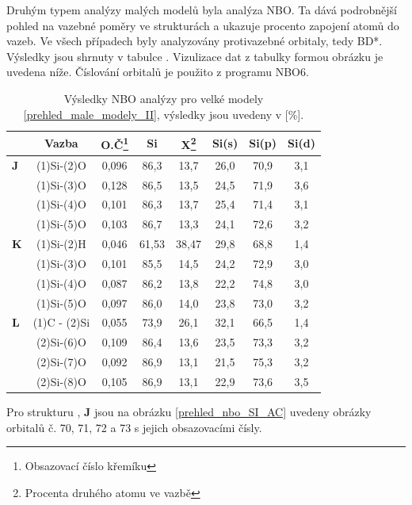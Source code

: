 \documentclass[
digital, %
table,   %
lof,     %
lot,     %
oneside,
]{fithesis3}
\begin{document}
Druhým typem analýzy malých modelů byla analýza NBO. Ta dává podrobnější pohled na vazebné poměry ve strukturách a ukazuje procento zapojení atomů do vazeb. Ve všech případech byly analyzovány protivazebné orbitaly, tedy BD*. Výsledky jsou shrnuty v tabulce . Vizulizace dat z tabulky formou obrázku je uvedena níže. Číslování orbitalů je použito z programu NBO6.
\begin{table}[htbp]
  \caption{Výsledky NBO analýzy pro velké modely \ref{prehled_male_modely_II}, výsledky jsou uvedeny v [\%].}
  \begin{minipage}{\textwidth}
\begin{center}
\begin{tabular}{|l|c|c|c|c|c|c|c|}

\hline\label{nbo_reaktanty_porovnani}&  Vazba & O.Č\footnote{Obsazovací číslo křemíku} & Si & X\footnote{Procenta druhého atomu ve  vazbě} & Si(s) & Si(p) &Si(d) \\ \hline
\textbf{J} & (1)Si-(2)O & 0,096 & 86,3  & 13,7  & 26,0  & 70,9  & 3,1  \\ \hline
 & (1)Si-(3)O & 0,128 & 86,5  & 13,5  & 24,5  & 71,9  & 3,6  \\ \hline
 & (1)Si-(4)O & 0,101 & 86,3  & 13,7  & 25,4  & 71,4  & 3,1  \\ \hline
 & (1)Si-(5)O & 0,103 & 86,7  & 13,3  & 24,1  & 72,6  & 3,2  \\ \hline

\textbf{K} & (1)Si-(2)H & 0,046 & 61,53  & 38,47  & 29,8  & 68,8  & 1,4  \\ \hline
 & (1)Si-(3)O & 0,101 & 85,5  & 14,5  & 24,2  & 72,9  & 3,0  \\ \hline
 & (1)Si-(4)O & 0,087 & 86,2  & 13,8  & 22,2  & 74,8  & 3,0  \\ \hline
 & (1)Si-(5)O & 0,097 & 86,0  & 14,0  & 23,8  & 73,0  & 3,2  \\ \hline
\textbf{L} & (1)C - (2)Si & 0,055 & 73,9  & 26,1  & 32,1  & 66,5  & 1,4  \\ \hline
 & (2)Si-(6)O & 0,109 & 86,4  & 13,6  & 23,5  & 73,3  & 3,2  \\ \hline
 & (2)Si-(7)O & 0,092 & 86,9  & 13,1  & 21,5  & 75,3  & 3,2  \\ \hline
 & (2)Si-(8)O & 0,105 & 86,9  & 13,1  & 22,9  & 73,6  & 3,5  \\ \hline
\end{tabular}
\end{center}\end{minipage}

\end{table}
Pro strukturu , \textbf{J} jsou na obrázku \ref{prehled_nbo_SI_AC} uvedeny obrázky orbitalů č. 70, 71, 72 a 73 s jejich obsazovacími čísly.
\end{document}
